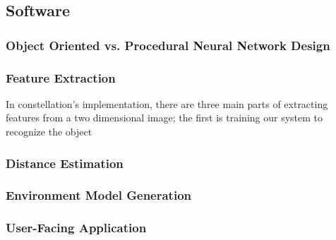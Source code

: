 \subsection{Software}
\subsubsection{Object Oriented vs. Procedural Neural Network Design}
\subsubsection{Feature Extraction}
In constellation's implementation, there are three main parts of extracting features from a two dimensional image; the first is training our system to recognize the object

\subsubsection{Distance Estimation}
\subsubsection{Environment Model Generation}
\subsubsection{User-Facing Application}